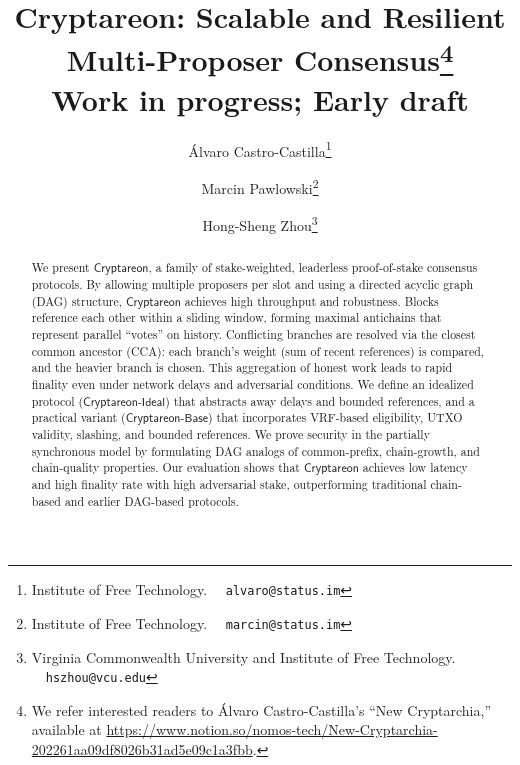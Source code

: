 \documentclass[11pt]{article}
\newcommand{\Proj}{\ensuremath{\mathsf{Cryptareon}}\xspace}
\newcommand{\ProjIdeal}{\ensuremath{\mathsf{Cryptareon\text{-}Ideal}}\xspace}
\newcommand{\ProjBase}{\ensuremath{\mathsf{Cryptareon\text{-}Base}}\xspace}
\begin{document}
\title{
Cryptareon: Scalable and Resilient Multi-Proposer Consensus\footnote{We refer interested readers to Álvaro Castro-Castilla’s ``New Cryptarchia,'' available at \url{https://www.notion.so/nomos-tech/New-Cryptarchia-202261aa09df8026b31ad5e09c1a3fbb}.}
\\
{\small {\sc Work in progress; Early draft}}
}
\author{
Álvaro Castro-Castilla\footnote{Institute of Free Technology. \ \ \texttt{alvaro@status.im}}
\and
Marcin Pawlowski\footnote{Institute of Free Technology. \ \ \texttt{marcin@status.im}}
\and
Hong-Sheng Zhou\footnote{Virginia Commonwealth University and Institute of Free Technology. \ \ \texttt{hszhou@vcu.edu}}
}

\maketitle





\setcounter{tocdepth}{3}
\setcounter{secnumdepth}{3}
\pagestyle{plain}

\begin{abstract}
We present \Proj, a family of stake-weighted, leaderless proof-of-stake consensus protocols. By allowing multiple proposers per slot and using a directed acyclic graph (DAG) structure, \Proj achieves high throughput and robustness. Blocks reference each other within a sliding window, forming maximal antichains that represent parallel “votes” on history. Conflicting branches are resolved via the closest common ancestor (CCA): each branch's weight (sum of recent references) is compared, and the heavier branch is chosen. This aggregation of honest work leads to rapid finality even under network delays and adversarial conditions. We define an idealized protocol (\ProjIdeal) that abstracts away delays and bounded references, and a practical variant (\ProjBase) that incorporates VRF-based eligibility, UTXO validity, slashing, and bounded references. We prove security in the partially synchronous model by formulating DAG analogs of common-prefix, chain-growth, and chain-quality properties. Our evaluation shows that \Proj achieves low latency and high finality rate with high adversarial stake, outperforming traditional chain-based and earlier DAG-based protocols.
\end{abstract}

\newpage
\small
\tableofcontents
\normalsize

\newpage
{}
\end{document}

